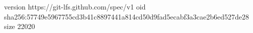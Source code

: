 version https://git-lfs.github.com/spec/v1
oid sha256:57749e5967755cd3b41c8897441a814cd50d9fad5ecabf3a3cae2b6ed527de28
size 22020
